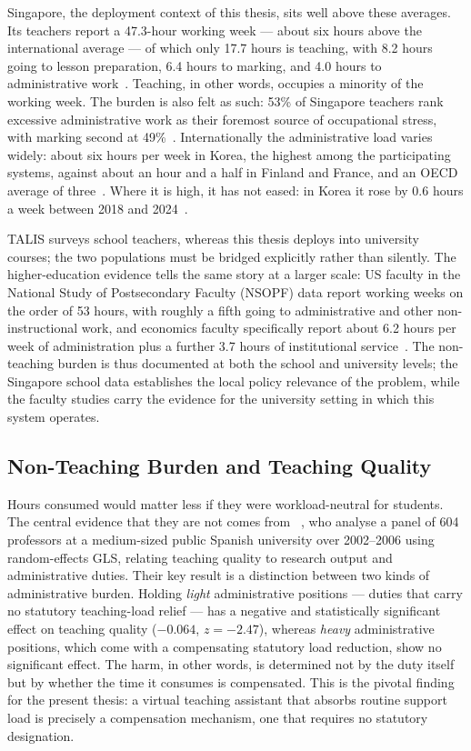 Singapore, the deployment context of this thesis, sits well above these
averages. Its teachers report a 47.3-hour working week --- about six hours
above the international average --- of which only 17.7 hours is teaching, with
8.2 hours going to lesson preparation, 6.4 hours to marking, and 4.0 hours to
administrative work~\cite{oecd25:TalisSG}. Teaching, in other words, occupies
a minority of the working week. The burden is also felt as such: 53\% of
Singapore teachers rank excessive administrative work as their foremost source
of occupational stress, with marking second at 49\%~\cite{oecd25:TalisSG}.
Internationally the administrative load varies widely: about six hours per
week in Korea, the highest among the participating systems, against about an
hour and a half in Finland and France, and an OECD average of
three~\cite{oecd25:Talis}. Where it is high, it has not eased: in Korea it
rose by 0.6 hours a week between 2018 and 2024~\cite{oecd25:TalisKR}.

TALIS surveys school teachers, whereas this thesis deploys into university
courses; the two populations must be bridged explicitly rather than silently.
The higher-education evidence tells the same story at a larger scale: US
faculty in the National Study of Postsecondary Faculty (NSOPF) data report
working weeks on the order of 53 hours, with roughly a fifth going to
administrative and other non-instructional work, and economics faculty
specifically report about 6.2 hours per week of administration plus a further
3.7 hours of institutional service~\cite{wp07:Allgood, aer13:Allgood}. The
non-teaching burden is thus documented at both the school and university
levels; the Singapore school data establishes the local policy relevance of the
problem, while the faculty studies carry the evidence for the university
setting in which this system operates.

\subsection{Non-Teaching Burden and Teaching Quality}
\label{review:subsec:quality}

Hours consumed would matter less if they were workload-neutral for students.
The central evidence that they are not comes from
\citet{apec15:GarciaGallego}~\cite{apec15:GarciaGallego}, who analyse a panel
of 604 professors at a medium-sized public Spanish university over 2002--2006
using random-effects GLS, relating teaching quality to research output and
administrative duties. Their key result is a distinction between two kinds of
administrative burden. Holding \emph{light} administrative positions ---
duties that carry no statutory teaching-load relief --- has a negative and
statistically significant effect on teaching quality ($-0.064$, $z = -2.47$),
whereas \emph{heavy} administrative positions, which come with a compensating
statutory load reduction, show no significant effect. The harm, in other
words, is determined not by the duty itself but by whether the time it
consumes is compensated. This is the pivotal finding for the present thesis:
a virtual teaching assistant that absorbs routine support load is precisely a
compensation mechanism, one that requires no statutory designation.

